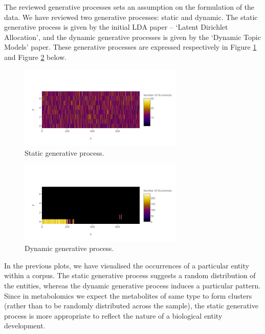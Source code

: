 \documentclass{mprop}
\begin{document}
\par The reviewed generative processes sets an assumption on the formulation of the data. We have reviewed two generative processes: static and dynamic. The static generative process is given by the initial LDA paper -- `Latent Dirichlet Allocation', and the dynamic generative processes is given by the `Dynamic Topic Models' paper. These generative processes are expressed respectively in Figure \ref{fig:static} and Figure \ref{fig:dynamic} below. 
\begin{figure}[H]
  \centering
  \includegraphics[width=0.7\textwidth]{static}
  \caption{Static generative process.}
  \label{fig:static}
\end{figure}
\begin{figure}[H]
  \centering
  \includegraphics[width=0.7\textwidth]{dynamic}
  \caption{Dynamic generative process.}
  \label{fig:dynamic}
\end{figure}
In the previous plots, we have visualised the occurrences of a particular entity within a corpus. The static generative process suggests a random distribution of the entities, whereas the dynamic generative process induces a particular pattern. Since in metabolomics we expect the metabolites of same type to form clusters (rather than to be randomly distributed across the sample), the static generative process is more appropriate to reflect the nature of a biological entity development.  

\end{document}
